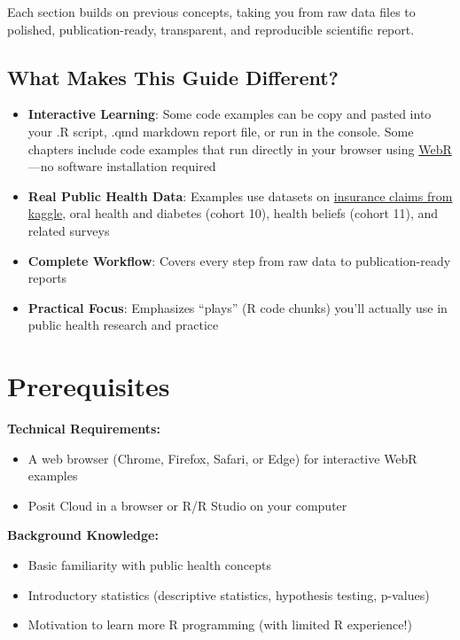 \documentclass[
  english,
  letterpaper,
  DIV=11,
  numbers=noendperiod]{scrreprt}
\providecommand{\tightlist}{%
  \setlength{\itemsep}{0pt}\setlength{\parskip}{0pt}}
\begin{document}
Each section builds on previous concepts, taking you from raw data files
to polished, publication-ready, transparent, and reproducible scientific
report.

\subsection{What Makes This Guide
Different?}\label{what-makes-this-guide-different}

\begin{itemize}
\tightlist
\item
  \textbf{Interactive Learning}: Some code examples can be copy and
  pasted into your .R script, .qmd markdown report file, or run in the
  console. Some chapters include code examples that run directly in your
  browser using \href{https://docs.r-wasm.org/webr/latest/}{WebR}---no
  software installation required
\item
  \textbf{Real Public Health Data}: Examples use datasets on
  \href{https://www.kaggle.com/code/pralabhpoudel/does-smoking-makes-your-insurance-high}{insurance
  claims from kaggle}, oral health and diabetes (cohort 10), health
  beliefs (cohort 11), and related surveys
\item
  \textbf{Complete Workflow}: Covers every step from raw data to
  publication-ready reports
\item
  \textbf{Practical Focus}: Emphasizes ``plays'' (R code chunks) you'll
  actually use in public health research and practice
\end{itemize}

\section{Prerequisites}\label{prerequisites}

\textbf{Technical Requirements:}

\begin{itemize}
\item
  A web browser (Chrome, Firefox, Safari, or Edge) for interactive WebR
  examples
\item
  Posit Cloud in a browser or R/R Studio on your computer
\end{itemize}

\textbf{Background Knowledge:}

\begin{itemize}
\item
  Basic familiarity with public health concepts
\item
  Introductory statistics (descriptive statistics, hypothesis testing,
  p-values)
\item
  Motivation to learn more R programming (with limited R experience!)
\end{itemize}
\end{document}
